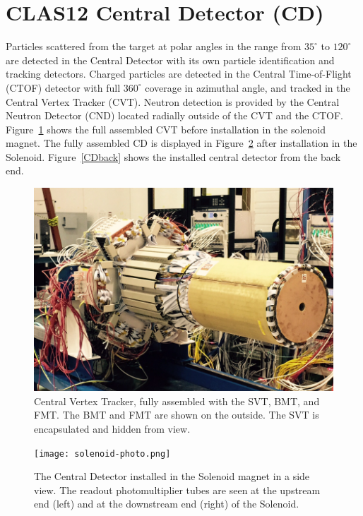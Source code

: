 \documentclass[final,3p,twocolumn]{elsarticle}
\begin{document}
\section{CLAS12 Central Detector (CD)} 
Particles scattered from the target at polar angles in the range from $35^\circ$  to $120^\circ$ are detected in the Central Detector with its own particle identification and tracking detectors. Charged particles are detected in the Central Time-of-Flight (CTOF) detector with full $360^\circ$ coverage in azimuthal angle, and tracked in the Central Vertex Tracker (CVT). Neutron detection is provided by the Central Neutron Detector (CND) located radially outside of the CVT and the CTOF.  Figure~\ref{CVT} shows the full assembled CVT before installation in the solenoid magnet. The fully assembled CD is displayed in  Figure~\ref{CDinSol} after installation in the Solenoid.  Figure~\ref{CDback} shows the installed central detector from the back end.    

\begin{figure}[htbp!]
\centerline{\includegraphics[width=1.0\columnwidth]{CVT.png}}
\caption{ \rm Central Vertex Tracker, fully assembled with the SVT, BMT, and FMT. The BMT and FMT are shown on the outside. The SVT is encapsulated and hidden from view. }
\label{CVT}
\end{figure}

\begin{figure}[htbp!]
\centerline{\texttt{[image: solenoid-photo.png]}}
\caption{The Central Detector installed in the Solenoid magnet in a side view. The readout photomultiplier tubes are seen at the upstream end (left) and at the downstream end (right) of the Solenoid. }
\label{CDinSol}
\end{figure}
\end{document}
